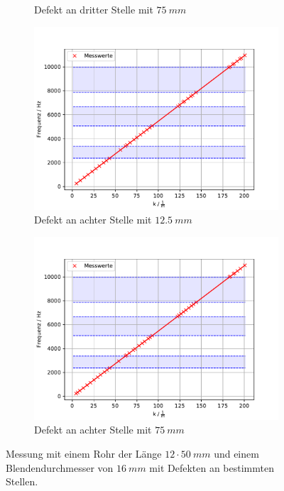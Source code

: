 \begin{figure}
\begin{subfigure}{0.48\textwidth}
    \caption{Defekt an dritter Stelle mit $\SI{75}{mm}$}
    \label{fig.Aufgabe122}
   \end{subfigure}

   \begin{subfigure}{0.48\textwidth}
    \centering
    \includegraphics[width=1.1\textwidth]{max3.pdf}
    \caption{Defekt an achter Stelle mit $\SI{12.5}{mm}$}
    \label{fig.Aufgabe123}
   \end{subfigure}
   \begin{subfigure}{0.48\textwidth}
    \centering
    \includegraphics[width=1.1\textwidth]{max4.pdf}
    \caption{Defekt an achter Stelle mit $\SI{75}{mm}$}
    \label{fig.Aufgabe124}
   \end{subfigure}
   \caption{Messung mit einem Rohr der Länge $12 \cdot \SI{50}{mm}$ und einem Blendendurchmesser von $\SI{16}{mm}$ mit Defekten an bestimmten Stellen.}
   \label{fig.Aufgabe12}
  \end{figure}
